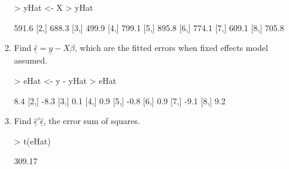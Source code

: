 \documentclass[12pt,a4paper]{paper}
\begin{document}
\begin{enumerate}
\begin{enumerate}
\begin{Schunk}
\begin{Sinput}
> yHat <- X %*% betaHat
> yHat
\end{Sinput}
\begin{Soutput}
      [,1]
[1,] 591.6
[2,] 688.3
[3,] 499.9
[4,] 799.1
[5,] 895.8
[6,] 774.1
[7,] 609.1
[8,] 705.8
\end{Soutput}
\end{Schunk}
\item Find $\underline{\hat{\epsilon}} = \underline{y} - X\beta$, which are the fitted errors when fixed effects model assumed.
\begin{Schunk}
\begin{Sinput}
> eHat <- y - yHat
> eHat
\end{Sinput}
\begin{Soutput}
     [,1]
[1,]  8.4
[2,] -8.3
[3,]  0.1
[4,]  0.9
[5,] -0.8
[6,]  0.9
[7,] -9.1
[8,]  9.2
\end{Soutput}
\end{Schunk}
\item Find $\underline{\hat{\epsilon}}'\underline{\hat{\epsilon}}$, the error sum of squares.
\begin{Schunk}
\begin{Sinput}
> t(eHat) %*% eHat
\end{Sinput}
\begin{Soutput}
       [,1]
[1,] 309.17
\end{Soutput}
\end{Schunk}
\end{enumerate}

\end{enumerate}
\end{document}
